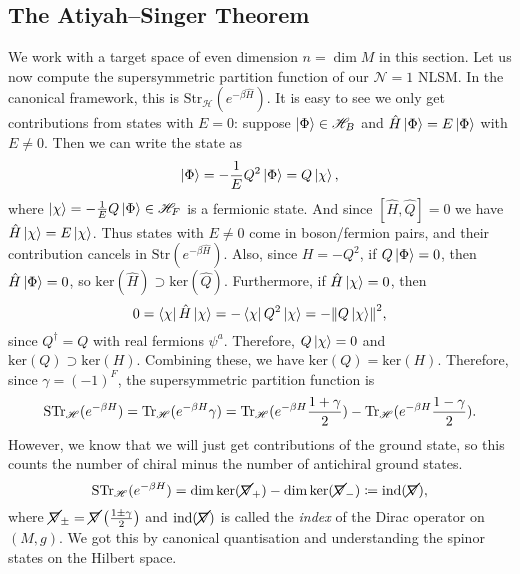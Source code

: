 \subsection{The Atiyah--Singer Theorem}%
\label{sub:the_atiyah_singer_theorem}

We work with a target space of even dimension $n = \dim M$ in this section.
Let us now compute the supersymmetric partition function of our $\mathcal{N} = 1$ NLSM. In the canonical framework, this is $\text{Str}_{\mathscr{H}} \left( e^{-\beta \hat{H}} \right)$.
It is easy to see we only get contributions from states with $E = 0$: suppose $\ket{\Phi} \in \mathscr{H}_B$ and $\hat{H} \ket{\Phi} = E \ket{\Phi}$ with $E \neq 0$. Then we can write the state as
\begin{equation}
  \ket{\Phi} = -\frac{1}{E} Q^2 \ket{\Phi} = Q \ket{\chi}, 
\end{equation}
where $\ket{\chi} = -\frac{1}{E} Q \ket{\Phi} \in \mathscr{H}_F$ is a fermionic state. And since $[\hat{H}, \hat{Q}] = 0$ we have $\hat{H} \ket{\chi} = E \ket{\chi}$.
Thus states with $E \neq 0$ come in boson/fermion pairs, and their contribution cancels in $\text{Str}( e^{-\beta \hat{H}} )$.
Also, since $H = -Q^2$, if $Q \ket{\Phi}  =0$, then $\hat{H} \ket{\Phi} = 0$, so $\text{ker}(\hat{H}) \supset \text{ker}(\hat{Q})$. Furthermore, if $\hat{H} \ket{\chi} = 0$, then
\begin{equation}
  0 = \bra{\chi} \hat{H} \ket{\chi} = -\bra{\chi} Q^2 \ket{\chi} = - \norm{Q \ket{\chi}}^2,
\end{equation}
since $Q^{\dagger} = Q$ with real fermions $\psi^a$. Therefore, $Q \ket{\chi} = 0$ and $\text{ker}(Q) \supset \text{ker}(H)$.
Combining these, we have $\text{ker}(Q) = \text{ker}(H)$. Therefore, since $\gamma = (-1)^F$, the supersymmetric partition function is
\begin{equation}
  \text{STr}_{\mathscr{H}} (e^{-\beta H}) = \Tr_{\mathscr{H}}(e^{-\beta H} \gamma) = \Tr_{\mathscr{H}}(e^{-\beta H} \frac{1 + \gamma}{2}) - \Tr_{\mathscr{H}}(e^{-\beta H} \frac{1 - \gamma}{2}).
\end{equation}
However, we know that we will just get contributions of the ground state, so this counts the number of chiral minus the number of antichiral ground states.
\begin{equation}
  \label{eq:10-pint}
  \text{STr}_{\mathscr{H}} (e^{-\beta H}) = \dim \ker (\cancel{\nabla}_+) - \dim \ker (\cancel{\nabla}_-) \coloneqq \text{ind}(\cancel{\nabla}),
\end{equation}
where $\cancel{\nabla}_\pm = \cancel{\nabla} \left( \frac{1 \pm \gamma}{2} \right)$ and $\text{ind} (\cancel{\nabla})$ is called the \emph{index} of the Dirac operator on $(M, g)$.
We got this by canonical quantisation and understanding the spinor states on the Hilbert space.

